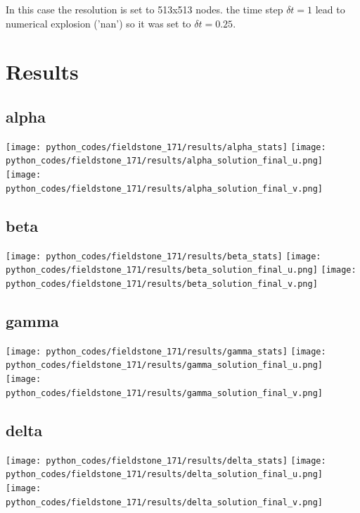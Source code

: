 In this case the resolution is set to 513x513 nodes.
the time step $\delta t=1$ lead to numerical explosion ('nan') so 
it was set to $\delta t=0.25$.






\newpage
\section*{Results}

\subsection*{alpha}

\begin{center}
\texttt{[image: python\_codes/fieldstone\_171/results/alpha\_stats]}
\texttt{[image: python\_codes/fieldstone\_171/results/alpha\_solution\_final\_u.png]}
\texttt{[image: python\_codes/fieldstone\_171/results/alpha\_solution\_final\_v.png]}
\end{center}

\subsection*{beta}

\begin{center}
\texttt{[image: python\_codes/fieldstone\_171/results/beta\_stats]}
\texttt{[image: python\_codes/fieldstone\_171/results/beta\_solution\_final\_u.png]}
\texttt{[image: python\_codes/fieldstone\_171/results/beta\_solution\_final\_v.png]}
\end{center}

\subsection*{gamma}

\begin{center}
\texttt{[image: python\_codes/fieldstone\_171/results/gamma\_stats]}
\texttt{[image: python\_codes/fieldstone\_171/results/gamma\_solution\_final\_u.png]}
\texttt{[image: python\_codes/fieldstone\_171/results/gamma\_solution\_final\_v.png]}
\end{center}

\subsection*{delta}
\begin{center}
\texttt{[image: python\_codes/fieldstone\_171/results/delta\_stats]}
\texttt{[image: python\_codes/fieldstone\_171/results/delta\_solution\_final\_u.png]}
\texttt{[image: python\_codes/fieldstone\_171/results/delta\_solution\_final\_v.png]}
\end{center}

